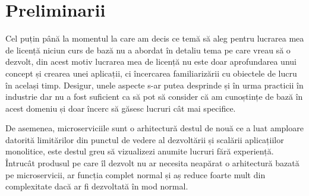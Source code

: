 \chapter{Preliminarii}
Cel puțin până la momentul la care am decis ce temă să aleg pentru lucrarea mea de licență niciun curs de bază 
nu a abordat în detaliu tema pe care vreau să o dezvolt, din acest motiv lucrarea mea de licență nu este doar
aprofundarea unui concept și crearea unei aplicații, ci încercarea familiarizării cu obiectele de lucru în același timp.
Desigur, unele aspecte s-ar putea desprinde și în urma practicii în industrie dar nu a fost suficient ca să
pot să consider că am cunoștințe de bază în acest domeniu și doar încerc să găsesc lucruri cât mai specifice.

De asemenea, microserviciile sunt o arhitectură destul de nouă ce a luat amploare datorită limitărilor din
punctul de vedere al dezvoltării și scalării aplicațiilor monolitice, este destul
greu să vizualizezi anumite lucruri fără experiență. Întrucât produsul
pe care îl dezvolt nu ar necesita neapărat o arhitectură bazată pe microservicii, ar funcția complet normal
și aș reduce foarte mult din complexitate dacă ar fi dezvoltată în mod normal.